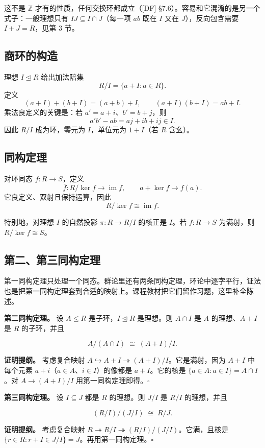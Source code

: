 这不是 $\mathbb Z$ 才有的性质，任何交换环都成立（[DF] §7.6）。容易和它混淆的是另一个式子：一般理想只有 $IJ\subseteq I\cap J$（每一项 $ab$ 既在 $I$ 又在 $J$），反向包含需要 $I+J=R$，见第 3 节。

\subsection{商环的构造}


理想 $I\trianglelefteq R$ 给出加法陪集
\[R/I=\{a+I:a\in R\}.\]
定义
\[ (a+I)+(b+I)=(a+b)+I,\qquad (a+I)(b+I)=ab+I.\]
乘法良定义的关键是：若 $a'=a+i$、$b'=b+j$，则
\[a'b'-ab=aj+ib+ij\in I.\]
因此 $R/I$ 成为环，零元为 $I$，单位元为 $1+I$（若 $R$ 含幺）。

\subsection{同构定理}


对环同态 $f:R\to S$，定义
\[\bar f:R/\ker f\longrightarrow\operatorname{im}f,\qquad a+\ker f\longmapsto f(a).\]
它良定义、双射且保持运算，因此
\[R/\ker f\cong\operatorname{im}f.\]

特别地，对理想 $I$ 的自然投影 $\pi:R\to R/I$ 的核正是 $I$。若 $f:R\to S$ 为满射，则 $R/\ker f\cong S$。

\subsection{第二、第三同构定理}


第一同构定理只处理一个同态。群论里还有两条同构定理，环论中逐字平行，证法也是把第一同构定理套到合适的映射上。课程教材把它们留作习题，这里补全陈述。

\textbf{第二同构定理。} 设 $A\le R$ 是子环，$I\trianglelefteq R$ 是理想。则 $A\cap I$ 是 $A$ 的理想、$A+I$ 是 $R$ 的子环，并且

\[
A/(A\cap I)\;\cong\;(A+I)/I.
\]

\textbf{证明提纲。} 考虑复合映射 $A\hookrightarrow A+I\twoheadrightarrow(A+I)/I$。它是满射，因为 $A+I$ 中每个元素 $a+i$（$a\in A$、$i\in I$）的像都是 $a+I$。它的核是 $\{a\in A:a\in I\}=A\cap I$。对 $A\to(A+I)/I$ 用第一同构定理即得。$\square$

\textbf{第三同构定理。} 设 $I\subseteq J$ 都是 $R$ 的理想。则 $J/I$ 是 $R/I$ 的理想，并且

\[
(R/I)\big/(J/I)\;\cong\;R/J.
\]

\textbf{证明提纲。} 考虑复合映射 $R\twoheadrightarrow R/I\twoheadrightarrow(R/I)/(J/I)$。它满，且核是 $\{r\in R:r+I\in J/I\}=J$。再用第一同构定理。$\square$

